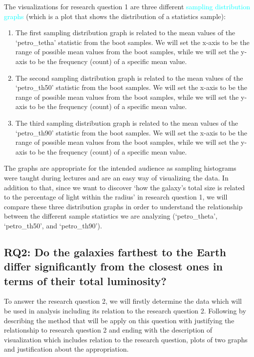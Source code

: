 \documentclass[12pt]{article}
\begin{document}
The visualizations for research question 1 are three different \textcolor{cyan}{sampling distribution graphs} (which is a plot that shows the distribution of a statistics sample):

\begin{enumerate}
	\item The first sampling distribution graph is related to the mean values of the `petro\_tetha' statistic from the boot samples. We will set the x-axis to be the range of possible mean values from the boot samples, while we will set the y-axis to be the frequency (count) of a specific mean value. 
	\item The second sampling distribution graph is related to the mean values of the `petro\_th50' statistic from the boot samples. We will set the x-axis to be the range of possible mean values from the boot samples, while we will set the y-axis to be the frequency (count) of a specific mean value. 
	\item The third sampling distribution graph is related to the mean values of the `petro\_th90' statistic from the boot samples. We will set the x-axis to be the range of possible mean values from the boot samples, while we will set the y-axis to be the frequency (count) of a specific mean value. 
\end{enumerate}

\noindent The graphs are appropriate for the intended audience as sampling histograms were taught during lectures and are an easy way of visualizing the data. In addition to that, since we want to discover `how the galaxy's total size is related to the percentage of light within the radius' in research question 1, we will compare these three distribution graphs in order to understand the relationship between the different sample statistics we are analyzing (`petro\_theta', `petro\_th50', and `petro\_th90').


\newpage

\subsection{RQ2: Do the galaxies farthest to the Earth differ significantly from the closest ones in terms of their total luminosity?}

To answer the research question 2, we will firstly determine the data which will be used in analysis including its relation to the research question 2. Following by describing the method that will be apply on this question with justifying the relationship to research question 2 and ending with the description of visualization which includes relation to the research question, plots of two graphs and justification about the appropriation. 
\end{document}
